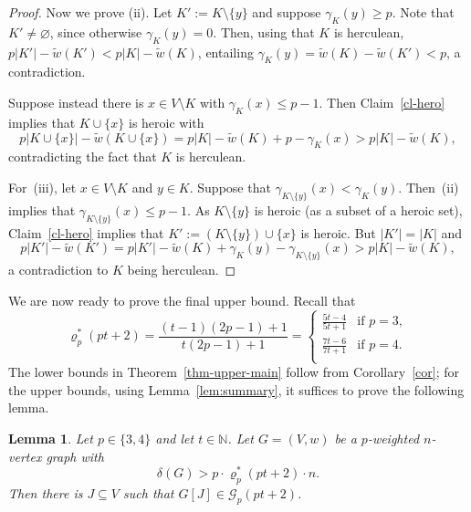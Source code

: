 \documentclass[10pt,a4paper]{article}
\newtheorem{lemma}[theorem]{Lemma}
\theoremstyle{definition}
\newcommand{\cG}{\mathcal{G}}
\begin{document}
\begin{proof}
	Now we prove (ii). Let $K' := K\setminus\lbrace y \rbrace$ and suppose $\gamma_K(y) \geq p$. Note that $K'\neq\varnothing$, since otherwise $\gamma_K(y)=0$. Then, using that $K$ is herculean, $p|K'|-\tilde{w}(K')<p|K|-\tilde{w}(K)$, entailing
	$\gamma_K(y)=\tilde{w}(K)-\tilde{w}(K')<p$, a contradiction.
	
	Suppose instead there is $x \in V\setminus K$ with $\gamma_K(x) \leq p-1$.
	Then Claim~\ref{cl-hero} implies that $K \cup\lbrace x\rbrace$ is heroic with 
	$$p|K \cup \lbrace x\rbrace| - \tilde{w}(K \cup \lbrace x\rbrace)=p|K|-\tilde{w}(K)+p-\gamma_K(x)>p|K|-\tilde{w}(K),$$ 
	contradicting the fact that $K$ is herculean.
	
	For~(iii), let $x \in V\setminus K$ and $y \in K$.
	Suppose that $\gamma_{K\setminus\{y\}}(x) < \gamma_K(y)$.
	Then~(ii) implies that $\gamma_{K\setminus\{y\}}(x) \leq p-1$.
	As $K\setminus\lbrace y \rbrace$ is heroic (as a subset of a heroic set), Claim~\ref{cl-hero} implies that $K' := (K\setminus\lbrace y \rbrace)\cup\lbrace x\rbrace$ is heroic. But $|K'|=|K|$ and 
	$$p|K'|-\tilde{w}(K') = p|K'|-\tilde{w}(K)+\gamma_K(y)-\gamma_{K\setminus\{y\}}(x) > p|K|-\tilde{w}(K),$$ 
	a contradiction to $K$ being herculean. 
\end{proof}

We are now ready to prove the final upper bound.
Recall that
$$
\varrho^*_p(pt+2) = \frac{(t-1)(2p-1)+1}{t(2p-1)+1} =
\begin{cases}
	\frac{5t-4}{5t+1} &\text{if }p=3,\\
	\frac{7t-6}{7t+1} &\text{if }p=4.\\
\end{cases}
$$
The lower bounds in Theorem~\ref{thm-upper-main} follow from Corollary~\ref{cor}; for the upper bounds, using Lemma~\ref{lem:summary}, it suffices to prove the following lemma.

\begin{lemma}\label{smallp}
	Let $p \in\lbrace 3,4\rbrace$ and let $t\in\mathbb{N}$.
	Let $G=(V,w)$ be a $p$-weighted $n$-vertex graph with
	$$\delta(G)>p \cdot \varrho_p^*(pt+2) \cdot n.$$
	Then there is $J \subseteq V$ such that $G[J] \in \cG_p(pt+2)$.
\end{lemma}
\end{document}
